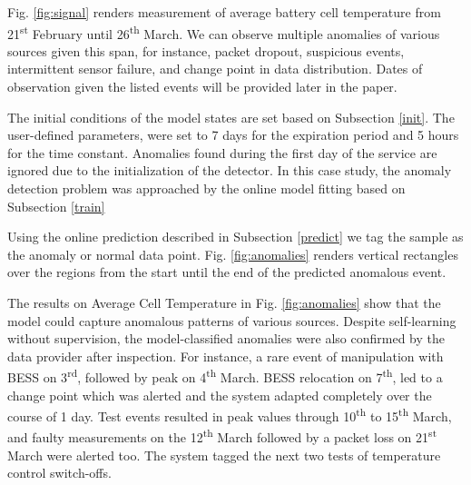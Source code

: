 Fig. \ref{fig:signal} renders measurement of average battery cell temperature from 21\textsuperscript{st} February until 26\textsuperscript{th} March. We can observe multiple anomalies of various sources given this span, for instance, packet dropout, suspicious events, intermittent sensor failure, and change point in data distribution. Dates of observation given the listed events will be provided later in the paper. 

The initial conditions of the model states are set based on Subsection \ref{init}. The user-defined parameters, were set to 7 days for the expiration period and 5 hours for the time constant. Anomalies found during the first day of the service are ignored due to the initialization of the detector. In this case study, the anomaly detection problem was approached by the online model fitting based on Subsection \ref{train}

Using the online prediction described in Subsection \ref{predict} we tag the sample as the anomaly or normal data point. Fig. \ref{fig:anomalies} renders vertical rectangles over the regions from the start until the end of the predicted anomalous event. 

The results on Average Cell Temperature in Fig. \ref{fig:anomalies} show that the model could capture anomalous patterns of various sources. Despite self-learning without supervision, the model-classified anomalies were also confirmed by the data provider after inspection. For instance, a rare event of manipulation with BESS on 3\textsuperscript{rd}, followed by peak on 4\textsuperscript{th} March. BESS relocation on 7\textsuperscript{th}, led to a change point which was alerted and the system adapted completely over the course of 1 day. Test events resulted in peak values through 10\textsuperscript{th} to 15\textsuperscript{th} March, and faulty measurements on the 12\textsuperscript{th} March followed by a packet loss on 21\textsuperscript{st} March were alerted too. The system tagged the next two tests of temperature control switch-offs. 

